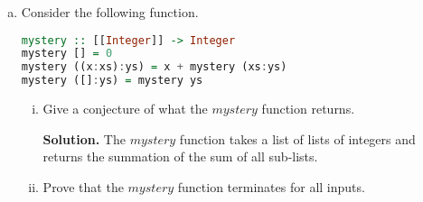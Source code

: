 \documentclass[11pt]{article}
\theoremstyle{definition}
\begin{document}
\begin{enumerate}
\begin{enumerate}[(a)]
\begin{enumerate}[i.]
The 3rd equation involves 2 recursive calls. Since the length of $xs$ is $n$ and $n >= 2$ when the equation is called, we have:
\begin{itemize}
	\item For the first recursive call, the argument of the recursive call is
	$a$. Since $a$ is the length of $getEvenIndexItems \textbf{ xs}$ such that $n >= 2$, thus $a < n$. Moreover, $rank$
	maps the input list to the length of the list, thus $rank \text{ n}= \text{n}$, $rank \text{ a}= \text{a}$, thus
	$rank \text{ n} > rank \text{ a}$, which indicates that $rank \text{ a}$ is strictly smaller than the input rank.
	\item For the second recursive call, the argument of the recursive call is
	$b$. Since $b$ is the length of $getOddIndexItems \textbf{ xs}$ such that $n >= 2$, thus $b < n$. Moreover, $rank$
	maps the input list to the length of the list, thus $rank \text{ n}= \text{n}$, $rank \text{ b}= \text{b}$, thus
	$rank \text{ n} > rank \text{ b}$, which indicates that $rank \text{ b}$ is strictly smaller than the input rank.
\end{itemize}

Since both ranks of argument decrease strictly as the recursion occurs, we can say that the function $mSort$ is guaranteed
to terminate for all inputs. \qed

\end{enumerate}

\item Consider the following function.
\begin{lstlisting}[language=Haskell]
mystery :: [[Integer]] -> Integer
mystery [] = 0
mystery ((x:xs):ys) = x + mystery (xs:ys)
mystery ([]:ys) = mystery ys
\end{lstlisting}
\begin{enumerate}[i.]
\item Give a conjecture of what the $mystery$ function returns.

\textbf{Solution.} The $mystery$ function takes a list of lists of integers and returns the summation of the sum of all sub-lists.
\item Prove that the $mystery$ function terminates for all inputs.


\end{enumerate}
\end{enumerate}
\end{enumerate}
\end{document}
